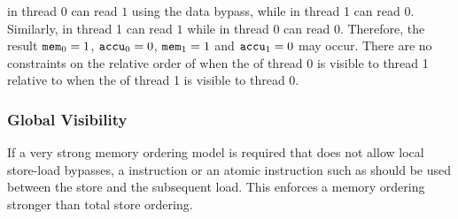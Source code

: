 \begin{table}[!hbt]
\noindent{}
\caption{Intra-Processor Forwarding is Allowed \cite[Example 8]{ref:AMD}}
\label{tbl:litmus:amd:8}
\end{table}

\noindent
{} in thread 0 can read $1$ using the data bypass, while  in thread 1 can read $0$.
Similarly,  in thread 1 can read $1$ while  in thread 0 can read $0$.
Therefore, the result $\texttt{mem}_0 = 1$, $\texttt{accu}_0 = 0$, $\texttt{mem}_1 = 1$ and $\texttt{accu}_1 = 0$ may occur.
There are no constraints on the relative order of when the  of thread 0 is visible to thread 1 relative to when the  of thread 1 is visible to thread 0.

\newpage

\subsubsection*{Global Visibility}

If a very strong memory ordering model is required that does not allow local store-load bypasses, a  instruction or an atomic instruction such as  should be used between the store and the subsequent load.
This enforces a memory ordering stronger than total store ordering.

